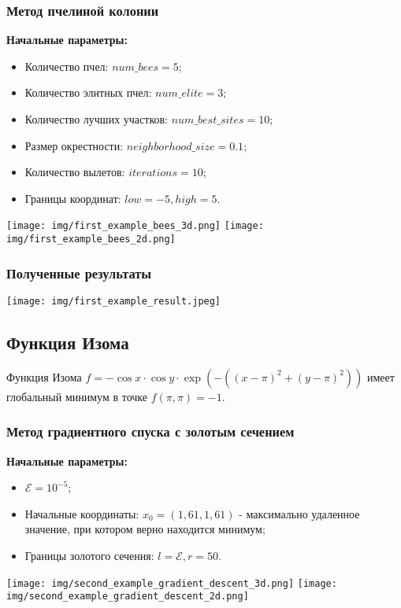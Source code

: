 \documentclass{article}
\begin{document}
\subsubsection*{Метод пчелиной колонии}
\textbf{Начальные параметры:}
\begin{itemize}
    \item Количество пчел: $num\_bees = 5$;
    \item Количество элитных пчел: $num\_elite = 3$;
    \item Количество лучших участков: $num\_best\_sites = 10$;
    \item Размер окрестности: $neighborhood\_size = 0.1$;
    \item Количество вылетов: $iterations = 10$;
    \item Границы координат: $low = -5, high = 5$.
\end{itemize}
\begin{center}
    \texttt{[image: img/first\_example\_bees\_3d.png]}
    \texttt{[image: img/first\_example\_bees\_2d.png]}
    \label{fig:enter-label}
\end{center}
\subsubsection*{Полученные результаты}
\texttt{[image: img/first\_example\_result.jpeg]}

\subsection*{Функция Изома}
Функция Изома $f = -\cos{x} \cdot \cos{y} \cdot \exp{(-((x - \pi)^2 + (y - \pi)^2))}$ имеет глобальный минимум в точке $f(\pi, \pi) = -1$.
\subsubsection*{Метод градиентного спуска с золотым сечением}
\textbf{Начальные параметры:}
\begin{itemize}
    \item $\mathcal{E} = 10^{-5}$;
    \item Начальные координаты: $x_0 = (1,61, 1,61)$ - максимально удаленное значение, при котором верно находится минимум;
    \item Границы золотого сечения: $l = \mathcal{E}, r = 50$.
\end{itemize}
\begin{center}
    \texttt{[image: img/second\_example\_gradient\_descent\_3d.png]}
    \texttt{[image: img/second\_example\_gradient\_descent\_2d.png]}
    \label{fig:enter-label}
\end{center}
\end{document}
